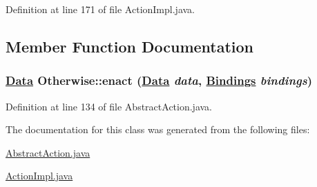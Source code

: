 Definition at line 171 of file Action\-Impl.java.

\subsection{Member Function Documentation}
\hypertarget{classOtherwise_a1}{
\subsubsection[enact]{\setlength{\rightskip}{0pt plus 5cm}\hyperlink{interfaceData}{Data} Otherwise::enact (\hyperlink{interfaceData}{Data} {\em data}, \hyperlink{interfaceBindings}{Bindings} {\em bindings})}}
\label{classOtherwise_a1}




Definition at line 134 of file Abstract\-Action.java.

The documentation for this class was generated from the following files:\begin{CompactItemize}
\item 
\hyperlink{AbstractAction_8java-source}{Abstract\-Action.java}\item 
\hyperlink{ActionImpl_8java-source}{Action\-Impl.java}\end{CompactItemize}
